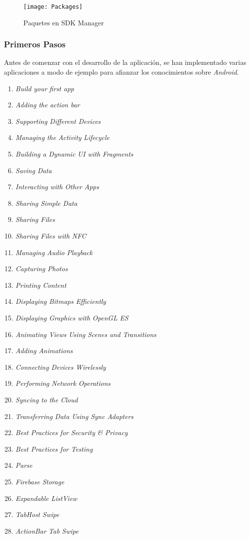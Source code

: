 	\begin{figure}[h !]
		\centering
		\texttt{[image: Packages]}
		\caption{Paquetes en SDK Manager}
		\label{fig:SdkManagerPackages}
	\end{figure}
	
	\subsubsection{Primeros Pasos}
	
		Antes de comenzar con el desarrollo de la aplicación, se han implementado varias aplicaciones a modo de ejemplo para afianzar los conocimientos sobre {\it Android}.
		
		\begin{enumerate}
			\item {\it Build your first app}\cite{29:firstapp:online}
			\item {\it Adding the action bar}
			\item {\it Supporting Different Devices}
			\item {\it Managing the Activity Lifecycle}
			\item {\it Building a Dynamic UI with Fragments}
			\item {\it Saving Data}
			\item {\it Interacting with Other Apps}
			\item {\it Sharing Simple Data}
			\item {\it Sharing Files}
			\item {\it Sharing Files with NFC}
			\item {\it Managing Audio Playback}
			\item {\it Capturing Photos}
			\item {\it Printing Content}
			\item {\it Displaying Bitmaps Efficiently}
			\item {\it Displaying Graphics with OpenGL ES}
			\item {\it Animating Views Using Scenes and Transitions}
			\item {\it Adding Animations}
			\item {\it Connecting Devices Wirelessly}
			\item {\it Performing Network Operations}
			\item {\it Syncing to the Cloud}
			\item {\it Transferring Data Using Sync Adapters}
			\item {\it Best Practices for Security \& Privacy}
			\item {\it Best Practices for Testing}
			\item {\it Parse}
			\item {\it Firebase Storage}
			\item {\it Expandable ListView}
			\item {\it TabHost Swipe}\cite{55:tabhostswipe:online}
			\item {\it ActionBar Tab Swipe}
		\end{enumerate}
	
